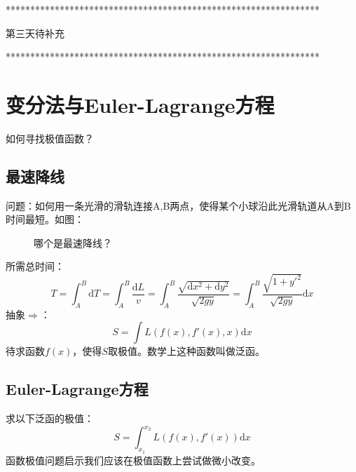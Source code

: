 \begin{center}
	****************************************************************
	
	
	
	第三天待补充
	
	
	
	
	****************************************************************
	
\end{center}

\section{变分法与Euler-Lagrange方程}


如何寻找极值函数？

\subsection{最速降线}

问题：如何用一条光滑的滑轨连接A,B两点，使得某个小球沿此光滑轨道从A到B时间最短。如图：

\begin{figure}[htbp!]
	\centering
	\caption{哪个是最速降线？}
\end{figure}

所需总时间：
\[T = \int_{A}^{B} \mathrm{d}T = \int_{A}^{B} \frac{\mathrm{d}L}{v} = \int_{A}^{B} \frac{\sqrt{\mathrm{d}x^2+\mathrm{d}y^2}}{\sqrt{2gy}} = \int_{A}^{B} \frac{\sqrt{1+y'^2}}{\sqrt{2gy}}\mathrm{d}x\]
抽象$\Rightarrow$：
\begin{equation}
S = \int L(f(x),f'(x),x)\mathrm{d}x
\end{equation}
待求函数$f(x)$，使得$S$取极值。数学上这种函数叫做泛函。

\subsection{Euler-Lagrange方程}
求以下泛函的极值：
\begin{equation}
S = \int_{x_1}^{x_2} L(f(x),f'(x))\mathrm{d}x
\end{equation}
函数极值问题启示我们应该在极值函数上尝试做微小改变。

